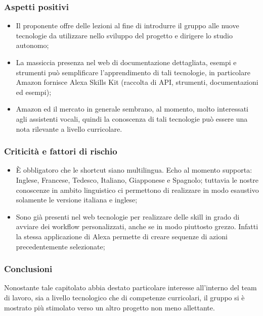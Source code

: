 \subsubsection{Aspetti positivi}
\begin{itemize}
    \item Il proponente offre delle lezioni al fine di introdurre il gruppo alle 
nuove tecnologie da utilizzare nello sviluppo del progetto e dirigere lo studio 
autonomo;
    \item La massiccia presenza nel web di documentazione dettagliata, esempi e 
strumenti può semplificare l'apprendimento di tali tecnologie, in 
particolare Amazon fornisce Alexa Skills Kit (raccolta di API, 
strumenti, documentazioni ed esempi);
    \item Amazon ed il mercato in generale sembrano, al momento, molto interessati 
agli assistenti vocali, quindi la conoscenza di tali tecnologie può essere una 
nota rilevante a livello curricolare.
\end{itemize}
\subsubsection{Criticità e fattori di rischio}
\begin{itemize}
    \item \`E obbligatoro che le shortcut siano multilingua. Echo al momento 
supporta: Inglese, Francese, Tedesco, Italiano, Giapponese e Spagnolo; tuttavia 
le nostre conoscenze in ambito linguistico ci permettono di realizzare in modo 
esaustivo solamente le versione italiana e inglese;
    \item Sono già presenti nel web tecnologie per realizzare delle skill\glo{} in 
    grado di avviare dei workflow\glo{} personalizzati, anche se in modo piuttosto grezzo.
    Infatti la stessa applicazione di Alexa permette di creare sequenze di azioni precedentemente 
selezionate;
 
\end{itemize}
\subsubsection{Conclusioni}
Nonostante tale capitolato abbia destato particolare interesse all'interno del 
team di lavoro, sia a livello tecnologico che di competenze curricolari, il 
gruppo si è mostrato più stimolato verso un altro progetto non meno allettante.


